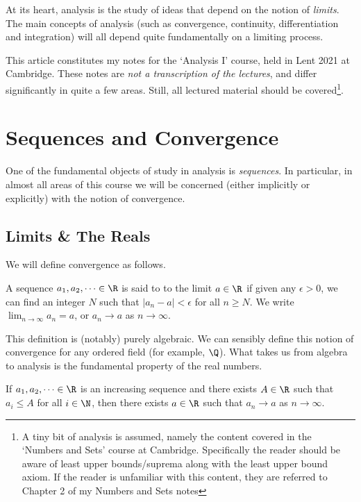 



At its heart, analysis is the study of ideas that depend on the notion of \emph{limits}.
The main concepts of analysis (such as convergence, continuity, differentiation and integration) will all depend quite fundamentally on a limiting process.

This article constitutes my notes for the `Analysis I' course, held in Lent 2021 at Cambridge. These notes are \emph{not a transcription of the lectures}, and differ significantly in quite a few areas. Still, all lectured material should be covered\footnote{A tiny bit of analysis is assumed, namely the content covered in the `Numbers and Sets' course at Cambridge. Specifically the reader should be aware of least upper bounds/suprema along with the least upper bound axiom. If the reader is unfamiliar with this content, they are referred to Chapter 2 of my Numbers and Sets notes}. 



\section{Sequences and Convergence} \label{sec:1.1}

One of the fundamental objects of study in analysis is \emph{sequences}. In particular, in almost all areas of this course we will be concerned (either implicitly or explicitly) with the notion of convergence.

\subsection{Limits \& The Reals}

We will define convergence as follows.

\begin{definition}[Convergence]
	A sequence $a_1, a_2, \dots \in \R$ is said to  to the limit $a \in \R$ if given any $\epsilon > 0$, we can find an integer $N$ such that $|a_n - a| < \epsilon$ for all $n \geq N$. We write $\displaystyle\lim_{n \to \infty}a_n = a$, or $a_n \rightarrow a$ as $n \rightarrow \infty$.
\end{definition}

This definition is (notably) purely algebraic. We can sensibly define this notion of convergence for any ordered field (for example, $\Q$). What takes us from algebra to analysis is the fundamental property of the real numbers.

\begin{axiomthm}
If $a_1, a_2, \dots \in \R$ is an increasing sequence and there exists $A \in \R$ such that $a_i \leq A$ for all $i \in \N$, then there exists $a \in \R$ such that $a_n \rightarrow a$ as $n \rightarrow \infty$.
\end{axiomthm}

